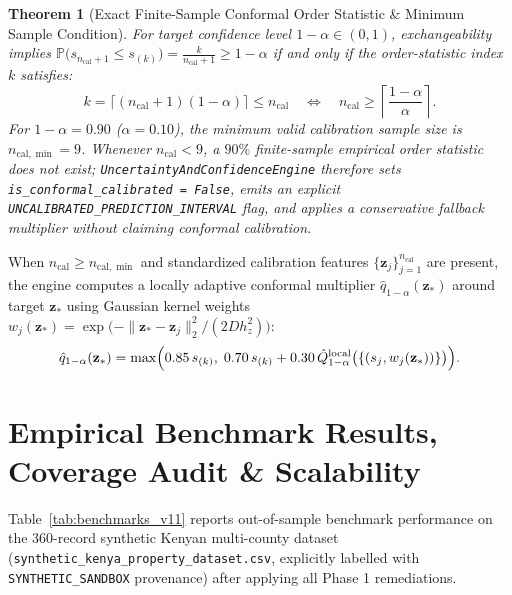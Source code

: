 \documentclass[11pt,a4paper]{article}
\newtheorem{theorem}{Theorem}[section]
\begin{document}
\begin{theorem}[Exact Finite-Sample Conformal Order Statistic \& Minimum Sample Condition]
For target confidence level $1 - \alpha \in (0, 1)$, exchangeability implies $\mathbb{P}\bigl(s_{n_{\text{cal}}+1} \le s_{(k)}\bigr) = \frac{k}{n_{\text{cal}}+1} \ge 1 - \alpha$ if and only if the order-statistic index $k$ satisfies:
\begin{equation}
    k = \bigl\lceil (n_{\text{cal}} + 1)(1 - \alpha) \bigr\rceil \le n_{\text{cal}} \quad \Longleftrightarrow \quad n_{\text{cal}} \ge \left\lceil \frac{1 - \alpha}{\alpha} \right\rceil.
\end{equation}
For $1 - \alpha = 0.90$ ($\alpha = 0.10$), the minimum valid calibration sample size is $n_{\text{cal},\min} = 9$. Whenever $n_{\text{cal}} < 9$, a $90\%$ finite-sample empirical order statistic does not exist; \texttt{UncertaintyAndConfidenceEngine} therefore sets \texttt{is\_conformal\_calibrated = False}, emits an explicit \texttt{UNCALIBRATED\_PREDICTION\_INTERVAL} flag, and applies a conservative fallback multiplier without claiming conformal calibration.
\end{theorem}

When $n_{\text{cal}} \ge n_{\text{cal},\min}$ and standardized calibration features $\{\mathbf{z}_j\}_{j=1}^{n_{\text{cal}}}$ are present, the engine computes a locally adaptive conformal multiplier $\hat{q}_{1-\alpha}(\mathbf{z}_*)$ around target $\mathbf{z}_*$ using Gaussian kernel weights $w_j(\mathbf{z}_*) = \exp\bigl(-\|\mathbf{z}_* - \mathbf{z}_j\|_2^2 / (2D h_z^2)\bigr)$:
\begin{equation}
    \hat{q}_{1-\alpha}(\mathbf{z}_*) = \max\Bigl(0.85\,s_{(k)},\; 0.70\,s_{(k)} + 0.30\,\hat{Q}_{1-\alpha}^{\text{local}}\bigl(\{(s_j, w_j(\mathbf{z}_*))\}\bigr)\Bigr).
\end{equation}

\section{Empirical Benchmark Results, Coverage Audit \& Scalability}

Table~\ref{tab:benchmarks_v11} reports out-of-sample benchmark performance on the 360-record synthetic Kenyan multi-county dataset (\texttt{synthetic\_kenya\_property\_dataset.csv}, explicitly labelled with \texttt{SYNTHETIC\_SANDBOX} provenance) after applying all Phase 1 remediations.
\end{document}

